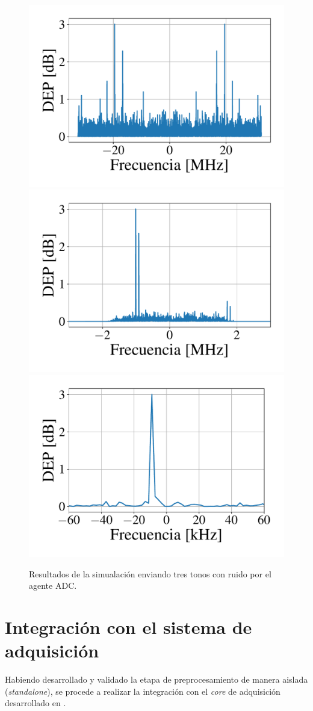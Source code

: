 \documentclass[../../main.tex]{subfiles}
\begin{document}
\begin{figure}[H]
    \centering
    {\includegraphics[width=0.49\linewidth]{tresTonosMuchoRuido-dataInFreq.pdf}}
    \hspace{\fill}%
    {\includegraphics[width=0.49\linewidth]{tresTonosMuchoRuido-bandFilterFreq.pdf}}
    \\[1PC]
    {\includegraphics[width=0.49\linewidth]{tresTonosMuchoRuido-channelFreq.pdf}}
    \caption{Resultados de la simualación enviando tres tonos con ruido por el agente ADC.}
    \label{fig::tresTonosMuchoRuido}
\end{figure}

\section{Integración con el sistema de adquisición}
Habiendo desarrollado y validado la etapa de preprocesamiento de manera aislada (\textit{standalone}), se procede a realizar la integración con el \textit{core} de adquisición desarrollado en \cite{proyecto-jose}.
\end{document}
